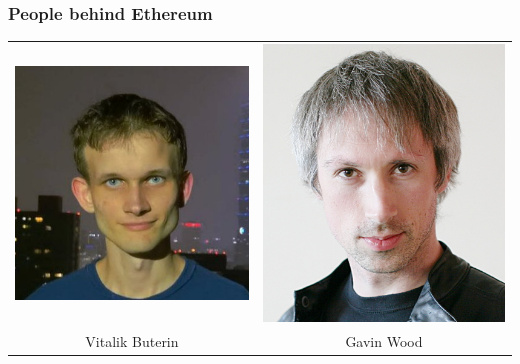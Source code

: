 \documentclass[11pt]{beamer}  %
\begin{document}
\begin{frame}\frametitle{People behind Ethereum}

  \begin{center}
  \begin{tabular}{c@{\hskip 1.5cm}c}
    \includegraphics[scale=.3,clip=false]{pictures/vitalik_buterin.jpg} &
    \includegraphics[scale=.247,clip=false]{pictures/gavin_wood.jpg} \\
    Vitalik Buterin & Gavin Wood
  \end{tabular}
  \end{center}
  
\end{frame}
\end{document}
